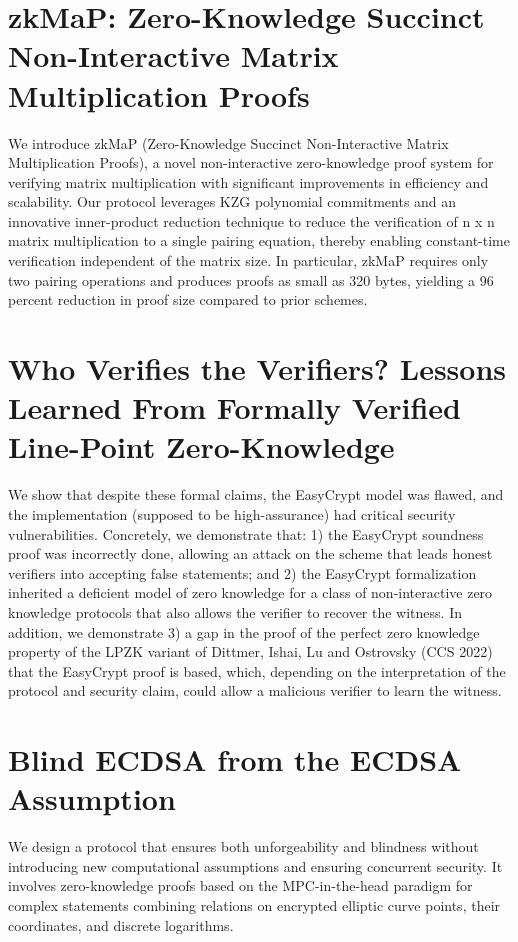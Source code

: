 \documentclass[11pt,oneside]{book}
\theoremstyle{definition}
\theoremstyle{remark}
\theoremstyle{plain}
\begin{document}
\section{\cite{10.62056/angy11fgx} zkMaP: Zero-Knowledge Succinct Non-Interactive Matrix Multiplication Proofs}
We introduce zkMaP (Zero-Knowledge Succinct Non-Interactive Matrix Multiplication Proofs), a novel non-interactive zero-knowledge proof system for verifying matrix multiplication with significant improvements in efficiency and scalability. Our protocol leverages KZG polynomial commitments and an innovative inner-product reduction technique to reduce the verification of n x n matrix multiplication to a single pairing equation, thereby enabling constant-time verification independent of the matrix size. In particular, zkMaP requires only two pairing operations and produces proofs as small as 320 bytes, yielding a 96 percent reduction in proof size compared to prior schemes.
\section{\cite{10.62056/a0wa0lmol,cryptoeprint:2025/1835} Who Verifies the Verifiers? Lessons Learned From Formally Verified Line-Point Zero-Knowledge}
We show that despite these formal claims, the EasyCrypt model was flawed, and the implementation (supposed to be high-assurance) had critical security vulnerabilities. Concretely, we demonstrate that: 1) the EasyCrypt soundness proof was incorrectly done, allowing an attack on the scheme that leads honest verifiers into accepting false statements; and 2) the EasyCrypt formalization inherited a deficient model of zero knowledge for a class of non-interactive zero knowledge protocols that also allows the verifier to recover the witness. In addition, we demonstrate 3) a gap in the proof of the perfect zero knowledge property of the LPZK variant of Dittmer, Ishai, Lu and Ostrovsky (CCS 2022) that the EasyCrypt proof is based, which, depending on the interpretation of the protocol and security claim, could allow a malicious verifier to learn the witness.
\section{\cite{10.62056/ahjbhee-3,cryptoeprint:2025/1827} Blind ECDSA from the ECDSA Assumption}
We design a protocol that ensures both unforgeability and blindness without introducing new computational assumptions and ensuring concurrent security. It involves zero-knowledge proofs based on the MPC-in-the-head paradigm for complex statements combining relations on encrypted elliptic curve points, their coordinates, and discrete logarithms.
\end{document}
